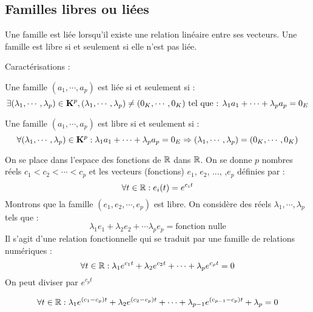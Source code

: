 \subsection{Familles libres ou liées}
\begin{defi}
 Une famille est liée lorsqu'il existe une relation linéaire entre ses vecteurs. Une famille est libre si et seulement si elle n'est pas liée.
\end{defi}
Caractérisations :
\begin{propn}
 Une famille $(a_1,\cdots,a_p)$ est liée si et seulement si :
\begin{displaymath}
 \exists(\lambda_1,\cdots,\lambda_p)\in\mathbf{K}^p , (\lambda_1,\cdots,\lambda_p)\neq (0_K,\cdots,0_K) \text{ tel que : }
\lambda_1a_1 + \cdots +\lambda_pa_p = 0_E
\end{displaymath}
\end{propn}
\begin{propn}
 Une famille $(a_1,\cdots,a_p)$ est libre si et seulement si :
\begin{displaymath}
 \forall(\lambda_1,\cdots,\lambda_p)\in\mathbf{K}^p :  \lambda_1a_1 + \cdots +\lambda_pa_p = 0_E \Rightarrow 
(\lambda_1,\cdots,\lambda_p)= (0_K,\cdots,0_K) 
\end{displaymath}
\end{propn}
\begin{exple}
 On se place dans l'espace des fonctions de $\mathbb{R}$ dans $\mathbb{R}$. On se donne $p$ nombres réels $c_1<c_2<\cdots<c_p$ et les vecteurs (fonctions) $e_1$, $e_2$, ..., ,$e_p$ définies par :
\begin{displaymath}
 \forall t\in\mathbb{R} : e_i(t) = e^{c_it}
\end{displaymath}
Montrons que la famille $(e_1,e_2,\cdots,e_p)$ est libre. On considère des réels $\lambda_1, \cdots, \lambda_p$ tels que :
\begin{displaymath}
 \lambda_1e_1 + \lambda_2 e_2 + \cdots \lambda_pe_p = \text{fonction nulle}
\end{displaymath}
Il s'agit d'une relation fonctionnelle qui se traduit par une famille de relations numériques :
\begin{displaymath}
 \forall t\in\mathbb{R} : \lambda_1e^{c_1t} + \lambda_2e^{c_2t} + \cdots +\lambda_pe^{c_pt} = 0
\end{displaymath}
On peut diviser par $e^{c_pt}$
\end{exple}
\begin{displaymath}
 \forall t\in\mathbb{R} : \lambda_1e^{(c_1-c_p)t} + \lambda_2e^{(c_2-c_p)t} + \cdots +\lambda_{p-1}e^{(c_{p-1}-c_p)t}+\lambda_p = 0
\end{displaymath}
